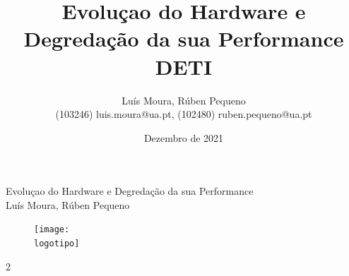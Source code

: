 \documentclass{report}
\begin{document}
%
\def\titulo{Evoluçao do Hardware e Degredação da sua Performance}
\def\data{Dezembro de 2021}
\def\autores{Luís Moura, Rúben Pequeno}
\def\autorescontactos{(103246) luis.moura@ua.pt, (102480) ruben.pequeno@ua.pt}
\def\versao{2}
\def\departamento{DETI}
\def\empresa{UA}
\def\logotipo{ua.pdf}
%
%
\begin{titlepage}

\begin{center}
%
\vspace*{50mm}
%
{\Huge \titulo}\\ 
%
\vspace{10mm}
%
%
\vspace{10mm}
%
{\LARGE \autores}\\ 
%
\vspace{30mm}
%
\begin{figure}[h]
\center
\texttt{[image: \\logotipo]}
\end{figure}
%
\vspace{30mm}
\end{center}
%
\begin{flushright}
\versao
\end{flushright}
\end{titlepage}

\title{%
{\Huge\textbf{\titulo}}\\
{\Large \departamento\\}
}
%
\author{%
    \autores \\
    \autorescontactos
}
%
\date{\data}
%
\maketitle


%



\tableofcontents
\end{document}

